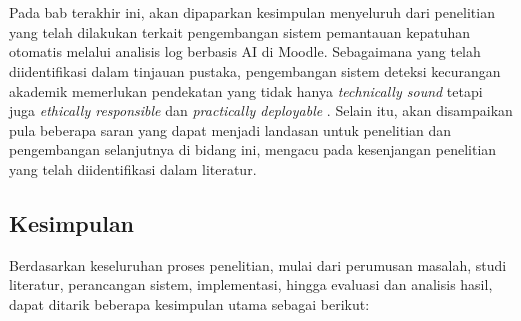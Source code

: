\chapter{\babLima} %
\label{bab:5} %
Pada bab terakhir ini, akan dipaparkan kesimpulan menyeluruh dari penelitian yang telah dilakukan terkait pengembangan sistem pemantauan kepatuhan otomatis melalui analisis log berbasis AI di Moodle. Sebagaimana yang telah diidentifikasi dalam tinjauan pustaka, pengembangan sistem deteksi kecurangan akademik memerlukan pendekatan yang tidak hanya \textit{technically sound} tetapi juga \textit{ethically responsible} dan \textit{practically deployable} \cite{Gasevic2015}. Selain itu, akan disampaikan pula beberapa saran yang dapat menjadi landasan untuk penelitian dan pengembangan selanjutnya di bidang ini, mengacu pada kesenjangan penelitian yang telah diidentifikasi dalam literatur.

\section{Kesimpulan}
\label{sec:kesimpulan_bab5}
Berdasarkan keseluruhan proses penelitian, mulai dari perumusan masalah, studi literatur, perancangan sistem, implementasi, hingga evaluasi dan analisis hasil, dapat ditarik beberapa kesimpulan utama sebagai berikut:


